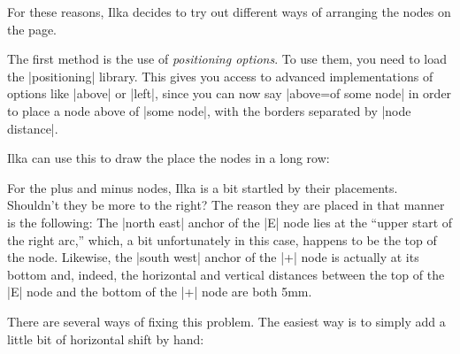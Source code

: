 For these reasons, Ilka decides to try out different ways of arranging
the nodes on the page.

The first method is the use of \emph{positioning options}. To use
them, you need to load the |positioning| library. This gives you
access to advanced implementations of options like |above| or |left|,
since you can now say |above=of some node| in order to place a node
above of |some node|, with the borders separated by |node distance|.

Ilka can use this to draw the place the nodes in a long row:
\begin{codeexample}[]
\end{codeexample}

For the plus and minus nodes, Ilka is a bit startled by their
placements. Shouldn't they be more to the right? The reason they are
placed in that manner is the following: The |north east| anchor of the
|E| node lies at the ``upper start of the right arc,'' which, a bit
unfortunately in this case, happens to be the top of the
node. Likewise, the |south west| anchor of the |+| node is actually at
its bottom and, indeed, the horizontal and vertical distances between
the top of the |E| node and the bottom of the |+| node are both 5mm.

There are several ways of fixing this problem. The
easiest way is to simply add a little bit of horizontal shift by hand:
\begin{codeexample}[]
\end{codeexample}

